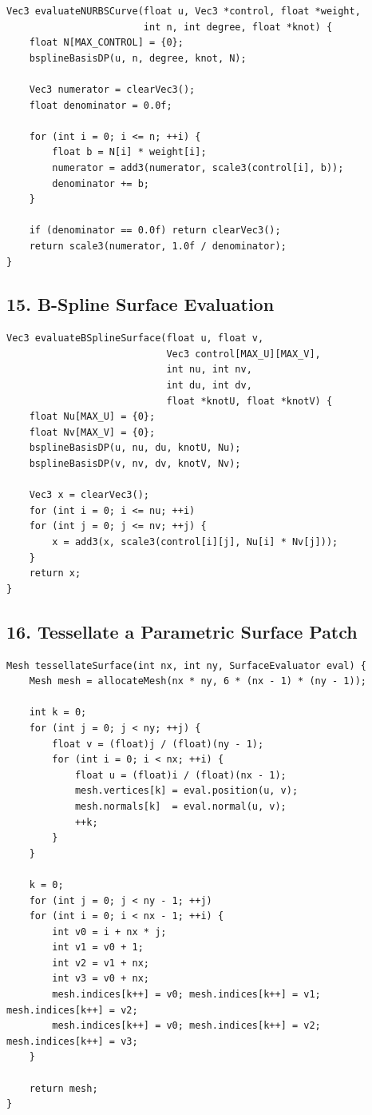 \documentclass[10pt,letterpaper]{article}
\begin{document}
\begin{verbatim}
Vec3 evaluateNURBSCurve(float u, Vec3 *control, float *weight,
                        int n, int degree, float *knot) {
    float N[MAX_CONTROL] = {0};
    bsplineBasisDP(u, n, degree, knot, N);

    Vec3 numerator = clearVec3();
    float denominator = 0.0f;

    for (int i = 0; i <= n; ++i) {
        float b = N[i] * weight[i];
        numerator = add3(numerator, scale3(control[i], b));
        denominator += b;
    }

    if (denominator == 0.0f) return clearVec3();
    return scale3(numerator, 1.0f / denominator);
}
\end{verbatim}

\subsection*{15. B-Spline Surface Evaluation}

\begin{verbatim}
Vec3 evaluateBSplineSurface(float u, float v,
                            Vec3 control[MAX_U][MAX_V],
                            int nu, int nv,
                            int du, int dv,
                            float *knotU, float *knotV) {
    float Nu[MAX_U] = {0};
    float Nv[MAX_V] = {0};
    bsplineBasisDP(u, nu, du, knotU, Nu);
    bsplineBasisDP(v, nv, dv, knotV, Nv);

    Vec3 x = clearVec3();
    for (int i = 0; i <= nu; ++i)
    for (int j = 0; j <= nv; ++j) {
        x = add3(x, scale3(control[i][j], Nu[i] * Nv[j]));
    }
    return x;
}
\end{verbatim}

\subsection*{16. Tessellate a Parametric Surface Patch}

\begin{verbatim}
Mesh tessellateSurface(int nx, int ny, SurfaceEvaluator eval) {
    Mesh mesh = allocateMesh(nx * ny, 6 * (nx - 1) * (ny - 1));

    int k = 0;
    for (int j = 0; j < ny; ++j) {
        float v = (float)j / (float)(ny - 1);
        for (int i = 0; i < nx; ++i) {
            float u = (float)i / (float)(nx - 1);
            mesh.vertices[k] = eval.position(u, v);
            mesh.normals[k]  = eval.normal(u, v);
            ++k;
        }
    }

    k = 0;
    for (int j = 0; j < ny - 1; ++j)
    for (int i = 0; i < nx - 1; ++i) {
        int v0 = i + nx * j;
        int v1 = v0 + 1;
        int v2 = v1 + nx;
        int v3 = v0 + nx;
        mesh.indices[k++] = v0; mesh.indices[k++] = v1; mesh.indices[k++] = v2;
        mesh.indices[k++] = v0; mesh.indices[k++] = v2; mesh.indices[k++] = v3;
    }

    return mesh;
}
\end{verbatim}
\end{document}
